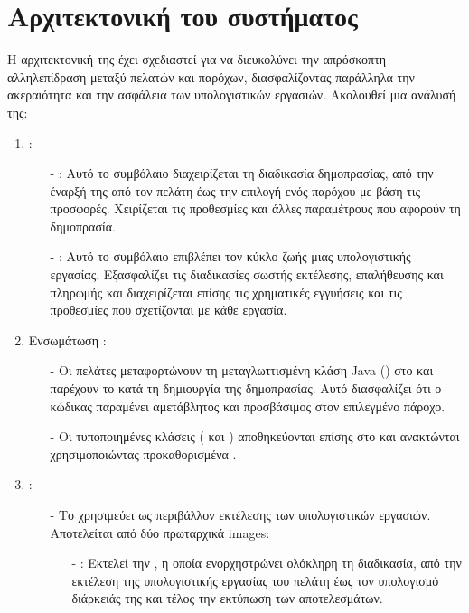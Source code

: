 \section{Αρχιτεκτονική του συστήματος}
Η αρχιτεκτονική της  έχει σχεδιαστεί για να διευκολύνει την απρόσκοπτη αλληλεπίδραση μεταξύ πελατών και παρόχων, διασφαλίζοντας παράλληλα την ακεραιότητα και την ασφάλεια των υπολογιστικών εργασιών. 
Ακολουθεί μια ανάλυσή της:
\begin{enumerate}
    \item {}:
        \begin{itemize}
            \item[-] : Αυτό το συμβόλαιο διαχειρίζεται τη διαδικασία δημοπρασίας, από την έναρξή της από τον πελάτη έως την επιλογή ενός παρόχου με βάση τις προσφορές. Χειρίζεται τις προθεσμίες και άλλες παραμέτρους που αφορούν τη δημοπρασία.
            \item[-] : Αυτό το συμβόλαιο επιβλέπει τον κύκλο ζωής μιας υπολογιστικής εργασίας. Εξασφαλίζει τις διαδικασίες σωστής εκτέλεσης, επαλήθευσης και πληρωμής και διαχειρίζεται επίσης τις χρηματικές εγγυήσεις και τις προθεσμίες που σχετίζονται με κάθε εργασία.
        \end{itemize}
    \item Ενσωμάτωση :
        \begin{itemize}
            \item[-] Οι πελάτες μεταφορτώνουν τη μεταγλωττισμένη κλάση Java () στο  και παρέχουν το  κατά τη δημιουργία της δημοπρασίας. Αυτό διασφαλίζει ότι ο κώδικας παραμένει αμετάβλητος και προσβάσιμος στον επιλεγμένο πάροχο. 
            \item[-] Οι τυποποιημένες  κλάσεις ( και ) αποθηκεύονται επίσης στο  και ανακτώνται χρησιμοποιώντας προκαθορισμένα . 
        \end{itemize}
    \item {}: 
    \begin{itemize} 
        \item[-] Το  χρησιμεύει ως περιβάλλον εκτέλεσης των υπολογιστικών εργασιών. Αποτελείται από δύο πρωταρχικά images:
        \begin{itemize}
            \item[-] : Εκτελεί την , η οποία ενορχηστρώνει ολόκληρη τη διαδικασία, από την εκτέλεση της υπολογιστικής εργασίας του πελάτη έως τον υπολογισμό διάρκειάς της και τέλος την εκτύπωση των αποτελεσμάτων.

\end{itemize}
\end{itemize}
\end{enumerate}
